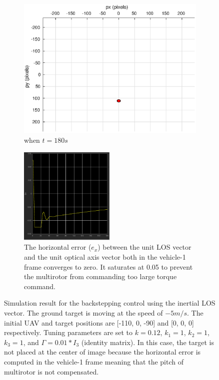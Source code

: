 \begin{figure}[htbp]
\begin{subfigure}[t]{0.32\linewidth}
		\includegraphics[width=\textwidth]{images/chapter4/inertial_camera_-5mps_180s}
		\caption{when $t=180s$}
	\end{subfigure}	
	\begin{subfigure}[t]{0.8\linewidth}
		\centering
		\includegraphics[width=0.5\textwidth]{images/chapter4/inertial_Ex_-5mps}
		\caption{The horizontal error ($e_x$) between the unit LOS vector and the unit optical axis vector both in the vehicle-1 frame converges to zero. It saturates at 0.05 to prevent the multirotor from commanding too large torque command.}
	\end{subfigure}	
	\caption{Simulation result for the backstepping control using the inertial LOS vector. The ground target is moving at the speed of $-5m/s$. The initial UAV and target positions are [-110, 0, -90] and [0, 0, 0] respectively. Tuning parameters are set to $k=0.12$, $k_1=1$, $k_2=1$, $k_3=1$, and $\Gamma=0.01*I_3$ (identity matrix). In this case, the target is not placed at the center of image because the horizontal error is computed in the vehicle-1 frame meaning that the pitch of multirotor is not compensated.}
	\label{inertial_-5mps}
\end{figure}

